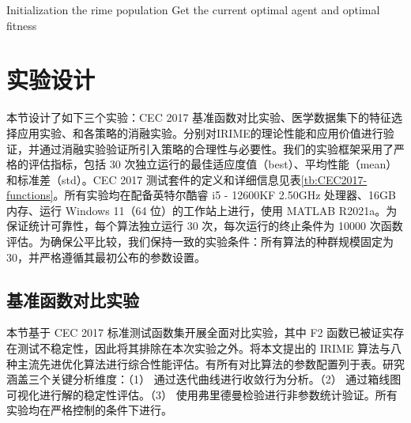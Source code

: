 \documentclass{wzuthesis}
\begin{document}
\begin{algorithm}[htbp]
    \caption{Pseudo-code of IRIME}
    \label{alg:irime}
    \SetAlgoLined
    Initialization the rime population \;
    Get the current optimal agent and optimal fitness \;
\end{algorithm}

\newpage

\section{实验设计}\label{sec:exp-settings}
本节设计了如下三个实验：CEC 2017 基准函数对比实验、医学数据集下的特征选择应用实验、和各策略的消融实验。分别对IRIME的理论性能和应用价值进行验证，并通过消融实验验证所引入策略的合理性与必要性。我们的实验框架采用了严格的评估指标，包括 30 次独立运行的最佳适应度值（best）、平均性能（mean）和标准差（std）。CEC 2017 测试套件的定义和详细信息见表\ref{tb:CEC2017-functions}。所有实验均在配备英特尔酷睿 i5 - 12600KF 2.50GHz 处理器、16GB 内存、运行 Windows 11（64 位）的工作站上进行，使用 MATLAB R2021a。为保证统计可靠性，每个算法独立运行 30 次，每次运行的终止条件为 10000 次函数评估。为确保公平比较，我们保持一致的实验条件：所有算法的种群规模固定为 30，并严格遵循其最初公布的参数设置。

\subsection{基准函数对比实验}
本节基于 CEC 2017 标准测试函数集开展全面对比实验，其中 F2 函数已被证实存在测试不稳定性，因此将其排除在本次实验之外。将本文提出的 IRIME 算法与八种主流先进优化算法进行综合性能评估。有所有对比算法的参数配置列于表。研究涵盖三个关键分析维度：（1） 通过迭代曲线进行收敛行为分析。（2） 通过箱线图可视化进行解的稳定性评估。（3） 使用弗里德曼检验进行非参数统计验证。所有实验均在严格控制的条件下进行。
\end{document}

